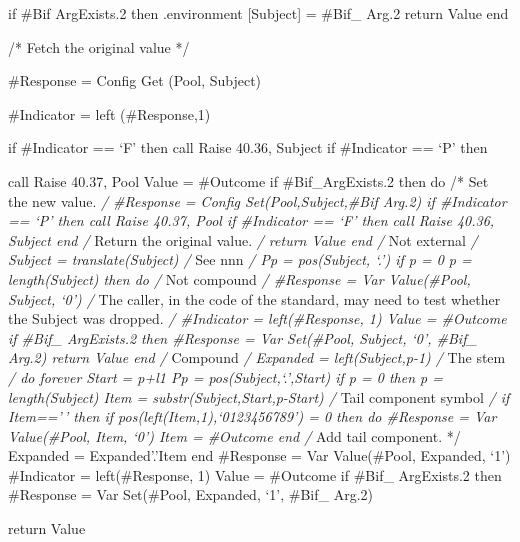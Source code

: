 if \#Bif ArgExists.2 then .environment {[}Subject{]} = \#Bif\_ Arg.2
return Value end

/* Fetch the original value */

\#Response = Config Get (Pool, Subject)

\#Indicator = left (\#Response,1)

if \#Indicator == `F' then call Raise 40.36, Subject if \#Indicator ==
`P' then

call Raise 40.37, Pool Value = \#Outcome if \#Bif\_ArgExists.2 then do
/* Set the new value. \emph{/ \#Response = Config Set(Pool,Subject,\#Bif
Arg.2) if \#Indicator == `P' then call Raise 40.37, Pool if \#Indicator
== `F' then call Raise 40.36, Subject end /} Return the original value.
\emph{/ return Value end /} Not external \emph{/ Subject =
translate(Subject) /} See nnn \emph{/ Pp = pos(Subject, `.') if p = 0
\textbar{} p = length(Subject) then do /} Not compound \emph{/
\#Response = Var Value(\#Pool, Subject, `0') /} The caller, in the code
of the standard, may need to test whether the Subject was dropped.
\emph{/ \#Indicator = left(\#Response, 1) Value = \#Outcome if \#Bif\_
ArgExists.2 then \#Response = Var Set(\#Pool, Subject, `0', \#Bif\_
Arg.2) return Value end /} Compound \emph{/ Expanded = left(Subject,p-1)
/} The stem \emph{/ do forever Start = p+l1 Pp = pos(Subject,`.',Start)
if p = 0 then p = length(Subject) Item = substr(Subject,Start,p-Start)
/} Tail component symbol \emph{/ if Item=='\,' then if
pos(left(Item,1),`0123456789') = 0 then do \#Response = Var
Value(\#Pool, Item, `0') Item = \#Outcome end /} Add tail component. */
Expanded = Expanded'.'Item end \#Response = Var Value(\#Pool, Expanded,
`1') \#Indicator = left(\#Response, 1) Value = \#Outcome if \#Bif\_
ArgExists.2 then \#Response = Var Set(\#Pool, Expanded, `1', \#Bif\_
Arg.2)

return Value
